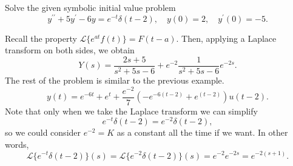 \documentclass[11pt]{article}
\begin{document}
\begin{problem}
Solve the given symbolic initial value problem
\begin{equation*}
y^{\prime \prime} + 5 y^{\prime} - 6 y = e^{-t}\delta(t-2), \quad y(0) =2 , \quad y^{\prime}(0) = -5.
\end{equation*}
\end{problem}
\begin{solution}
Recall the property $\mathcal{L}\{e^{at}f(t)\}=F(t-a)$. Then, applying a Laplace transform on both sides, we obtain
\begin{equation*}
Y(s)=\frac{2s+5}{s^{2}+5s-6}+e^{-2}\frac{1}{s^{2}+5s-6}e^{-2s}.
\end{equation*}
The rest of the problem is similar to the previous example.
\[\boxed{y(t)=e^{-6t}+e^{t}+\frac{e^{-2}}{7}\left( -e^{-6(t-2)}+e^{(t-2)} \right)u(t-2)}.\]
Note that only when we take the Laplace transform we can simplify \[e^{-t}\delta(t-2)=e^{-2}\delta(t-2),\]
so we could consider $e^{-2}=K$ as a constant all the time if we want. In other words,
\[\mathcal{L}\{e^{-t}\delta(t-2)\}(s)=\mathcal{L}\{e^{-2}\delta(t-2)\}(s)=e^{-2}e^{-2s}=e^{-2(s+1)}.\]
\end{solution}
\end{document}
